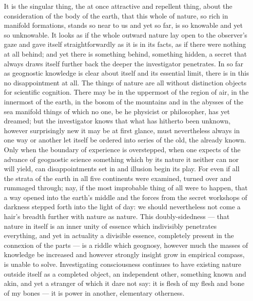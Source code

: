 \documentclass[12pt,a4paper]{book}
\begin{document}
It is the singular thing, the at once attractive and repellent thing, about the consideration of the body of the earth,
that this
whole of nature, so rich in manifold formations, stands so near to us and yet so far, is so knowable and yet so
unknowable. It looks as if the whole outward nature lay open to the observer's gaze and gave itself straightforwardly as
it is in its facts, as if there were nothing at all behind; and yet there is something behind, something hidden, a secret
that always draws itself further back the deeper the investigator penetrates. In so far as geognostic knowledge is clear
about itself and its essential limit, there is in this no disappointment at all. The things of nature are all without
distinction objects for scientific cognition. There may be in the uppermost of the region of air, in the innermost of the
earth, in the bosom of the mountains and in the abysses of the sea manifold things of which no one, be he physicist or
philosopher, has yet dreamed; but the investigator knows that what has hitherto been unknown, however surprisingly new it
may be at first glance, must nevertheless always in one way or another let itself be ordered into series of the old, the
already known. Only when the boundary of experience is overstepped, when one expects of the advance of geognostic science
something which by its nature it neither can nor will yield, can disappointments set in and illusion begin its play. For
even if all the strata of the earth in all five continents were examined, turned over and rummaged through; nay, if the
most improbable thing of all were to happen, that a way opened into the earth's middle and the forces from the secret
workshops of darkness stepped forth into the light of day: we should nevertheless not come a hair's breadth further with
nature as nature. This doubly-sidedness --- that nature in itself is an inner unity of essence which indivisibly
penetrates everything, and yet in actuality a divisible essence, completely present in the connexion of the parts --- is
a riddle which geognosy, however much the masses of knowledge be increased and however strongly insight grow in empirical
compass, is unable to solve. Investigating consciousness continues to have existing nature
outside itself as a completed object, an independent other, something known and akin, and yet a stranger of which it dare
not say: it is flesh of my flesh and bone of my bones --- it is power in another, elementary otherness.
\end{document}
